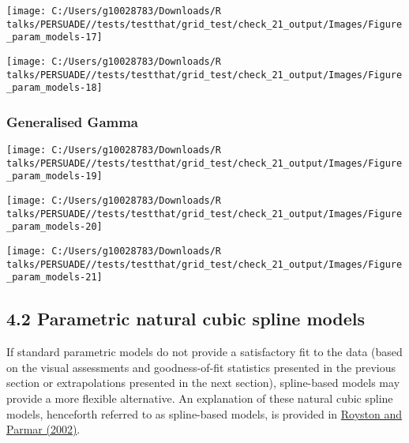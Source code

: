 \documentclass[
]{article}
\begin{document}
\begin{flushleft}\texttt{[image: C:/Users/g10028783/Downloads/R talks/PERSUADE//tests/testthat/grid\_test/check\_21\_output/Images/Figure\_param\_models-17]} \end{flushleft}

\begin{flushleft}\texttt{[image: C:/Users/g10028783/Downloads/R talks/PERSUADE//tests/testthat/grid\_test/check\_21\_output/Images/Figure\_param\_models-18]} \end{flushleft}

\clearpage

\subsubsection{Generalised Gamma}\label{generalised-gamma}

\begin{flushleft}\texttt{[image: C:/Users/g10028783/Downloads/R talks/PERSUADE//tests/testthat/grid\_test/check\_21\_output/Images/Figure\_param\_models-19]} \end{flushleft}

\begin{flushleft}\texttt{[image: C:/Users/g10028783/Downloads/R talks/PERSUADE//tests/testthat/grid\_test/check\_21\_output/Images/Figure\_param\_models-20]} \end{flushleft}

\begin{flushleft}\texttt{[image: C:/Users/g10028783/Downloads/R talks/PERSUADE//tests/testthat/grid\_test/check\_21\_output/Images/Figure\_param\_models-21]} \end{flushleft}

\clearpage

\subsection{4.2 Parametric natural cubic spline
models}\label{parametric-natural-cubic-spline-models}

If standard parametric models do not provide a satisfactory fit to the
data (based on the visual assessments and goodness-of-fit statistics
presented in the previous section or extrapolations presented in the
next section), spline-based models may provide a more flexible
alternative. An explanation of these natural cubic spline models,
henceforth referred to as spline-based models, is provided in
\href{https://doi.org/10.1002/sim.1203}{Royston and Parmar (2002)}.
\end{document}
